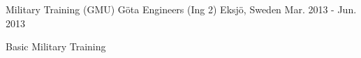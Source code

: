 \begin{cventries}

  \cventry
  {Military Training (GMU)} %
  {Göta Engineers (Ing 2)} %
  {Eksjö, Sweden} %
  {Mar. 2013 - Jun. 2013} %
  {
    \begin{cvitems} %
      \item {Basic Military Training}
    \end{cvitems}
  }

\end{cventries}
